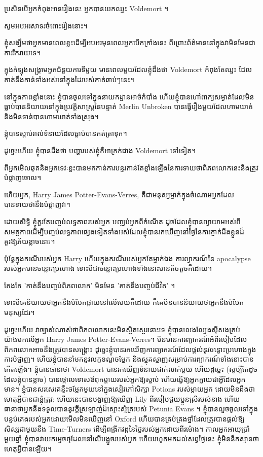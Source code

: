 \begin{writtenNote}

ប្រសិនបើអ្នកកំពុងអានរឿងនេះ អ្នកបានយកឈ្នះ Voldemort ។

សូមអបអរសាទរចំពោះរឿងនោះ។

ខ្ញុំសង្ឃឹមថាអ្នកមានពេលខ្លះដើម្បីអបអរមុនពេលអ្នកបើកក្រាំងនេះ ពីព្រោះព័ត៌មាននៅក្នុងវាមិនមែនជាការរីករាយទេ។

ក្នុងកំឡុងសង្គ្រាមអ្នកជំនួយការទីមួយ មានពេលមួយដែលខ្ញុំដឹងថា Voldemort កំពុងតែឈ្នះ ដែលគាត់នឹងកាន់ទាំងអស់នៅក្នុងដៃរបស់គាត់ឆាប់ៗនេះ។

នៅក្នុងភាពខ្លាំងនោះ ខ្ញុំបានចូលទៅក្នុងនាយកដ្ឋានអាថ៌កំបាំង ហើយខ្ញុំបានហៅពាក្យសម្ងាត់ដែលមិនធ្លាប់បាននិយាយនៅក្នុងប្រវត្តិសាស្រ្តនៃបន្ទាត់ Merlin Unbroken បានធ្វើរឿងមួយដែលហាមឃាត់ និងមិនទាន់បានហាមឃាត់ទាំងស្រុង។

ខ្ញុំ​បាន​ស្ដាប់​រាល់​ទំនាយ​ដែល​ធ្លាប់​បាន​កត់ត្រា​ទុក។

ដូច្នេះហើយ ខ្ញុំបានដឹងថា បញ្ហារបស់ខ្ញុំគឺអាក្រក់ជាង Voldemort ទៅទៀត។

ពី​អ្នក​មើល​ឆុត​និង​អ្នក​ទេវៈ​ខ្លះ​បាន​មក​កាន់​ការ​បន្ទរ​កាន់​តែ​ខ្លាំង​ឡើង​នៃ​ការ​ទាយ​ថា​ពិភពលោក​នេះ​នឹង​ត្រូវ​បំផ្លាញ​ចោល។

ហើយអ្នក, Harry James Potter-Evans-Verres, គឺជាមនុស្សម្នាក់ក្នុងចំណោមអ្នកដែលបានទាយថានឹងបំផ្លាញវា។

ដោយសិទ្ធិ ខ្ញុំគួរតែបញ្ចប់លទ្ធភាពរបស់អ្នក បញ្ឈប់អ្នកពីកំណើត ដូចដែលខ្ញុំបានព្យាយាមអស់ពីសមត្ថភាពដើម្បីបញ្ចប់លទ្ធភាពផ្សេងទៀតទាំងអស់ដែលខ្ញុំបានរកឃើញនៅថ្ងៃនៃការភ្ញាក់ដឹងខ្លួនដ៏គួរឱ្យភ័យខ្លាចនោះ។

ប៉ុន្តែក្នុងករណីរបស់អ្នក Harry ហើយក្នុងករណីរបស់អ្នកតែម្នាក់ឯង ការព្យាករណ៍នៃ apocalypse របស់អ្នកមានចន្លោះប្រហោង ទោះបីជាចន្លោះប្រហោងទាំងនោះមានតិចតួចក៏ដោយ។

តែងតែ 'គាត់នឹងបញ្ចប់ពិភពលោក' មិនមែន 'គាត់នឹងបញ្ចប់ជីវិត' ។

ទោះ​បី​គេ​និយាយ​ថា​អ្នក​នឹង​បំបែក​ផ្កាយ​នៅ​លើ​មេឃ​ក៏​ដោយ ក៏​គេ​មិន​បាន​និយាយ​ថា​អ្នក​នឹង​បំបែក​មនុស្ស​ដែរ។

ដូច្នេះហើយ វាច្បាស់ណាស់ថាពិភពលោកនេះមិនស្ថិតស្ថេរនោះទេ ខ្ញុំបានលេងល្បែងស៊ីសងគ្រប់យ៉ាងមកលើអ្នក Harry James Potter-Evans-Verres។ មិនមានការព្យាករណ៍អំពីរបៀបដែលពិភពលោកអាចនឹងត្រូវបានសង្រ្គោះ ដូច្នេះខ្ញុំបានរកឃើញការព្យាករណ៍ដែលផ្តល់នូវចន្លោះប្រហោងក្នុងការបំផ្លាញ។ ហើយ​ខ្ញុំ​បាន​នាំ​មក​នូវ​លក្ខខណ្ឌ​ចម្លែក និង​ស្មុគស្មាញ​សម្រាប់​ការ​ព្យាករណ៍​ទាំង​នោះ​បាន​កើត​ឡើង។ ខ្ញុំបានធានាថា Voldemort បានរកឃើញទំនាយជាក់លាក់មួយ ហើយដូច្នេះ (សូម្បីតែដូចដែលខ្ញុំបានខ្លាច) បានថ្កោលទោសឪពុកម្តាយរបស់អ្នកឱ្យស្លាប់ ហើយធ្វើឱ្យអ្នកក្លាយជាអ្វីដែលអ្នកមាន។ ខ្ញុំបានសរសេរគន្លឹះចម្លែកមួយនៅក្នុងសៀវភៅសិក្សា Potions របស់ម្តាយអ្នក ដោយមិនដឹងថាហេតុអ្វីបានជាខ្ញុំត្រូវ; ហើយនេះបានបង្ហាញឱ្យឃើញ Lily ពីរបៀបជួយប្អូនស្រីរបស់នាង ហើយធានាថាអ្នកនឹងទទួលបាននូវក្តីស្រឡាញ់ដ៏ស្មោះស្ម័គ្ររបស់ Petunia Evans ។ ខ្ញុំបានលួចចូលទៅក្នុងបន្ទប់គេងរបស់អ្នកដោយមើលមិនឃើញនៅ Oxford ហើយបានគ្រប់គ្រងថ្នាំដែលត្រូវបានផ្តល់ឱ្យសិស្សជាមួយនឹង Time-Turners ដើម្បីពង្រីកវដ្តនៃថ្ងៃរបស់អ្នកដោយពីរម៉ោង។ កាល​អ្នក​អាយុ​ប្រាំមួយ​ឆ្នាំ ខ្ញុំ​បាន​វាយ​កម្ទេច​ថ្ម​ដែល​នៅ​លើ​បង្អួច​របស់​អ្នក ហើយ​រហូត​មក​ដល់​សព្វ​ថ្ងៃ​នេះ ខ្ញុំ​មិន​នឹក​ស្មាន​ថា​ហេតុ​អ្វី​បាន​ឡើយ។


\end{writtenNote}

